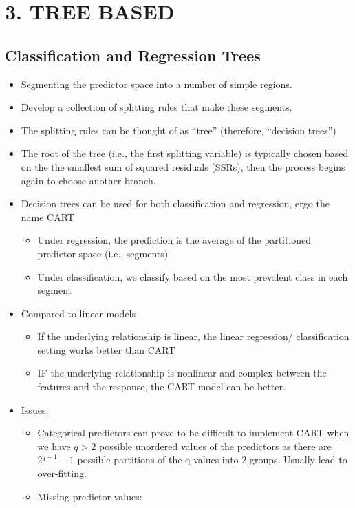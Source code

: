 \documentclass[
]{book}
\begin{document}
\hypertarget{part-3.-tree-based}{%
\part{3. TREE BASED}\label{part-3.-tree-based}}

\hypertarget{classification-and-regression-trees}{%
\chapter{Classification and Regression Trees}\label{classification-and-regression-trees}}

\begin{itemize}
\item
  Segmenting the predictor space into a number of simple regions.
\item
  Develop a collection of splitting rules that make these segments.
\item
  The splitting rules can be thought of as ``tree'' (therefore, ``decision trees'')
\item
  The root of the tree (i.e., the first splitting variable) is typically chosen based on the the smallest sum of squared residuals (SSRs), then the process begins again to choose another branch.
\item
  Decision trees can be used for both classification and regression, ergo the name CART

  \begin{itemize}
  \item
    Under regression, the prediction is the average of the partitioned predictor space (i.e., segments)
  \item
    Under classification, we classify based on the most prevalent class in each segment
  \end{itemize}
\item
  Compared to linear models

  \begin{itemize}
  \item
    If the underlying relationship is linear, the linear regression/ classification setting works better than CART
  \item
    IF the underlying relationship is nonlinear and complex between the features and the response, the CART model can be better.
  \end{itemize}
\item
  Issues:

  \begin{itemize}
  \item
    Categorical predictors can prove to be difficult to implement CART when we have \(q >2\) possible unordered values of the predictors as there are \(2^{q-1} - 1\) possible partitions of the q values into 2 groups. Usually lead to over-fitting.
  \item
    Missing predictor values:


\end{itemize}
\end{itemize}
\end{document}
